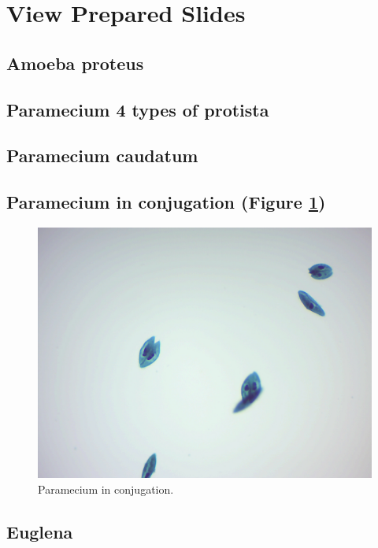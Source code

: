 \section{View Prepared Slides}\label{view-prepared-slides-3}

\subsection{Amoeba proteus}\label{amoeba-proteus-1}

\subsection{Paramecium 4 types of
protista}\label{paramecium-4-types-of-protista}

\subsection{Paramecium caudatum}\label{paramecium-caudatum-1}

\subsection{Paramecium in conjugation (Figure
\ref{fig:conjugation})}\label{paramecium-in-conjugation-figure-reffigconjugation}

\begin{figure}

{\centering \includegraphics[width=0.7\linewidth]{./figures/protists/paramecium_conjugation}

}

\caption{Paramecium in conjugation.}\label{fig:conjugation}
\end{figure}

\subsection{Euglena}\label{euglena-1}

